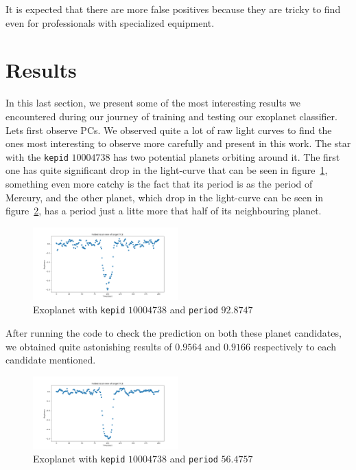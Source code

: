 \documentclass[twoside]{article}
\newcommand{\code}[1]{\texttt{#1}}
\begin{document}
\begin{multicols}{2}
It is expected that there are more false positives because they are tricky to find even for professionals with specialized equipment.


\section{Results}
In this last section, we present some of the most interesting results we encountered during our journey of training and testing our exoplanet classifier.\\

Lets first observe PCs. We observed quite a lot of raw light curves to find the ones most interesting to observe more carefully and present in this work. The star with the \code{kepid} $10004738$ has two potential planets orbiting around it. The first one has quite significant drop in the light-curve that can be seen in figure~\ref{fig:resPC1}, something even more catchy is the fact that its period is as the period of Mercury, and the other planet, which drop in the light-curve can be seen in figure~\ref{fig:resPC11}, has a period just a litte more that half of its neighbouring planet. 
\begin{figure}[H]
\includegraphics[width=0.5\textwidth]{resPC1}
\caption{Exoplanet with \code{kepid} $10004738$ and \code{period} $92.8747$}
\label{fig:resPC1}
\end{figure}

After running the code to check the prediction on both these planet candidates, we obtained quite astonishing results of $0.9564$ and $0.9166$ respectively to each candidate mentioned.
\begin{figure}[H]
\includegraphics[width=0.5\textwidth]{resPC11}
\caption{Exoplanet with \code{kepid} $10004738$ and \code{period} $56.4757$}
\label{fig:resPC11}
\end{figure}


\end{multicols}
\end{document}
